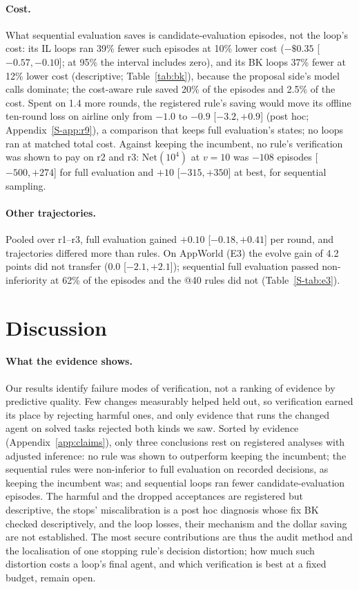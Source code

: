 \documentclass[11pt]{article}
\begin{document}
\paragraph{Cost.} What sequential evaluation saves is candidate-evaluation episodes, not the loop's cost: its IL loops ran 39\% fewer such episodes at 10\% lower cost ($-\$0.35$ [$-0.57,-0.10$]; at 95\% the interval includes zero), and its BK loops 37\% fewer at 12\% lower cost (descriptive; Table~\ref{tab:bk}), because the proposal side's model calls dominate; the cost-aware rule saved 20\% of the episodes and 2.5\% of the cost. Spent on 1.4 more rounds, the registered rule's saving would move its offline ten-round loss on airline only from $-1.0$ to $-0.9$ [$-3.2,+0.9$] (post hoc; Appendix~\ref*{S-app:r9}), a comparison that keeps full evaluation's states; no loops ran at matched total cost. Against keeping the incumbent, no rule's verification was shown to pay on r2 and r3: $\mathrm{Net}(10^4)$ at $v=10$ was $-108$ episodes [$-500,+274$] for full evaluation and $+10$ [$-315,+350$] at best, for sequential sampling.

\paragraph{Other trajectories.} Pooled over r1--r3, full evaluation gained $+0.10$ [$-0.18,+0.41$] per round, and trajectories differed more than rules. On AppWorld (E3) the evolve gain of 4.2 points did not transfer ($0.0$ [$-2.1,+2.1$]); sequential full evaluation passed non-inferiority at 62\% of the episodes and the @40 rules did not (Table~\ref*{S-tab:e3}).

\section{Discussion}

\paragraph{What the evidence shows.} Our results identify failure modes of verification, not a ranking of evidence by predictive quality. Few changes measurably helped held out, so verification earned its place by rejecting harmful ones, and only evidence that runs the changed agent on solved tasks rejected both kinds we saw. Sorted by evidence (Appendix~\ref{app:claims}), only three conclusions rest on registered analyses with adjusted inference: no rule was shown to outperform keeping the incumbent; the sequential rules were non-inferior to full evaluation on recorded decisions, as keeping the incumbent was; and sequential loops ran fewer candidate-evaluation episodes. The harmful and the dropped acceptances are registered but descriptive, the stops' miscalibration is a post hoc diagnosis whose fix BK checked descriptively, and the loop losses, their mechanism and the dollar saving are not established. The most secure contributions are thus the audit method and the localisation of one stopping rule's decision distortion; how much such distortion costs a loop's final agent, and which verification is best at a fixed budget, remain open.
\end{document}
